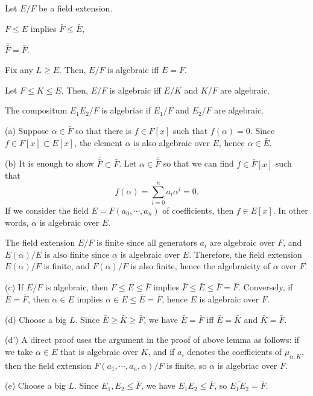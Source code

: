\documentclass{../note}
\begin{document}
\begin{prb}
Let $E/F$ be a field extension.
\begin{parts}
\item $F\le E$ implies $\bar F\le \bar E$,
\item $\bar{\bar F}=\bar F$.
\item Fix any $L\ge E$. Then, $E/F$ is algebraic iff $\bar E=\bar F$.
\item Let $F\le K\le E$. Then, $E/F$ is algebraic iff $E/K$ and $K/F$ are algebraic.
\item The compositum $E_1E_2/F$ is algebriac if $E_1/F$ and $E_2/F$ are algebraic.
\end{parts}
\end{prb}
\begin{pf}
(a)
Suppose $\alpha\in\bar F$ so that there is $f\in F[x]$ such that $f(\alpha)=0$.
Since $f\in F[x]\subset E[x]$, the element $\alpha$ is also algebraic over $E$, hence $\alpha\in\bar E$.

(b)
It is enough to show $\bar{\bar F}\subset\bar F$.
Let $\alpha\in\bar{\bar F}$ so that we can find $f\in\bar F[x]$ such that
\[f(\alpha)=\sum_{i=0}^na_i\alpha^i=0.\]
If we consider the field $E=F(a_0,\cdots,a_n)$ of coefficients, then $f\in E[x]$.
In other words, $\alpha$ is algebraic over $E$.

The field extension $E/F$ is finite since all generators $a_i$ are algebraic over $F$, and $E(\alpha)/E$ is also finite since $\alpha$ is algebraic over $E$.
Therefore, the field extension $E(\alpha)/F$ is finite, and $F(\alpha)/F$ is also finite, hence the algebraicity of $\alpha$ over $F$.

(c)
If $E/F$ is algebraic, then $F\le E\le\bar F$ implies $\bar F\le\bar E\le\bar{\bar F}=\bar F$.
Conversely, if $\bar E=\bar F$, then $\alpha\in E$ implies $\alpha\in E\le\bar E=\bar F$, hence $E$ is algebraic over $F$.

(d)
Choose a big $L$.
Since $\bar E\ge\bar K\ge\bar F$, we have $\bar E=\bar F$ iff $\bar E=\bar K$ and $\bar K=\bar F$.

(d')
A direct proof uses the argument in the proof of above lemma as follows: if we take $\alpha\in E$ that is algebraic over $K$, and if $a_i$ denotes the coefficients of $\mu_{\alpha,K}$, then the field extension $F(a_1,\cdots,a_n,\alpha)/F$ is finite, so $\alpha$ is algebriac over $F$.

(e)
Choose a big $L$.
Since $E_1,E_2\le\bar F$, we have $E_1E_2\le\bar F$, so $\bar{E_1E_2}=\bar{F}$.
\end{pf}
\end{document}
